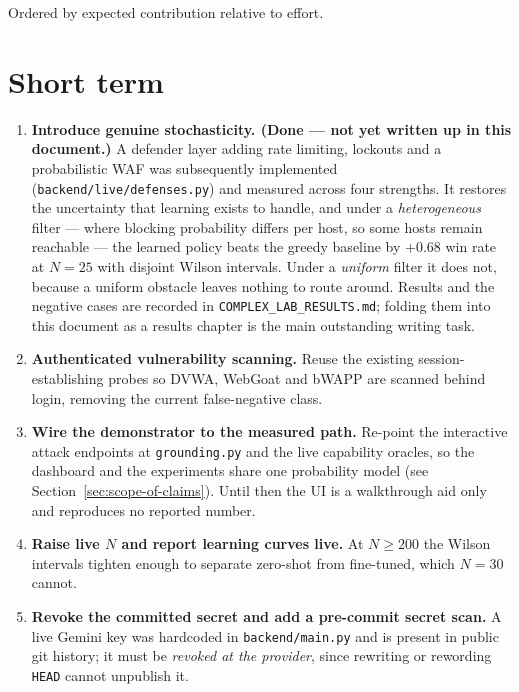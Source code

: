 \documentclass[11pt,a4paper]{report}
\newcommand{\code}[1]{\texttt{\small #1}}
\begin{document}
Ordered by expected contribution relative to effort.

\section{Short term}
\begin{enumerate}[leftmargin=*]
  \item \textbf{Introduce genuine stochasticity. \textup{(Done --- not yet
  written up in this document.)}} A defender layer adding rate limiting,
  lockouts and a probabilistic WAF was subsequently implemented
  (\code{backend/live/defenses.py}) and measured across four strengths. It
  restores the uncertainty that learning exists to handle, and under a
  \emph{heterogeneous} filter --- where blocking probability differs per host,
  so some hosts remain reachable --- the learned policy beats the greedy
  baseline by $+0.68$ win rate at $N=25$ with disjoint Wilson intervals. Under
  a \emph{uniform} filter it does not, because a uniform obstacle leaves
  nothing to route around. Results and the negative cases are recorded in
  \code{COMPLEX\_LAB\_RESULTS.md}; folding them into this document as a
  results chapter is the main outstanding writing task.
  \item \textbf{Authenticated vulnerability scanning.} Reuse the existing
  session-establishing probes so DVWA, WebGoat and bWAPP are scanned behind
  login, removing the current false-negative class.
  \item \textbf{Wire the demonstrator to the measured path.} Re-point the
  interactive attack endpoints at \code{grounding.py} and the live capability
  oracles, so the dashboard and the experiments share one probability model
  (see Section~\ref{sec:scope-of-claims}). Until then the UI is a walkthrough
  aid only and reproduces no reported number.
  \item \textbf{Raise live $N$ and report learning curves live.} At
  $N \geq 200$ the Wilson intervals tighten enough to separate zero-shot from
  fine-tuned, which $N = 30$ cannot.
  \item \textbf{Revoke the committed secret and add a pre-commit secret scan.}
  A live Gemini key was hardcoded in \code{backend/main.py} and is present in
  public git history; it must be \emph{revoked at the provider}, since rewriting
  or rewording \code{HEAD} cannot unpublish it.
\end{enumerate}
\end{document}
